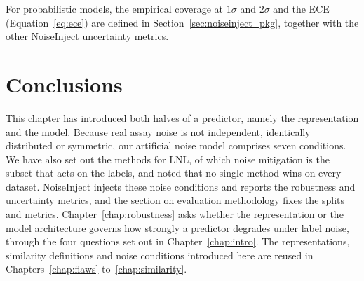 For probabilistic models, the empirical coverage at $1\sigma$ and $2\sigma$ and the ECE (Equation~\ref{eq:ece}) are defined in Section~\ref{sec:noiseinject_pkg}, together with the other NoiseInject uncertainty metrics.

\section{Conclusions}


This chapter has introduced both halves of a predictor, namely the representation and the model. Because real assay noise is not independent, identically distributed or symmetric, our artificial noise model comprises seven conditions. We have also set out the methods for LNL, of which noise mitigation is the subset that acts on the labels, and noted that no single method wins on every dataset. NoiseInject injects these noise conditions and reports the robustness and uncertainty metrics, and the section on evaluation methodology fixes the splits and metrics. Chapter~\ref{chap:robustness} asks whether the representation or the model architecture governs how strongly a predictor degrades under label noise, through the four questions set out in Chapter~\ref{chap:intro}. The representations, similarity definitions and noise conditions introduced here are reused in Chapters~\ref{chap:flaws} to~\ref{chap:similarity}.

